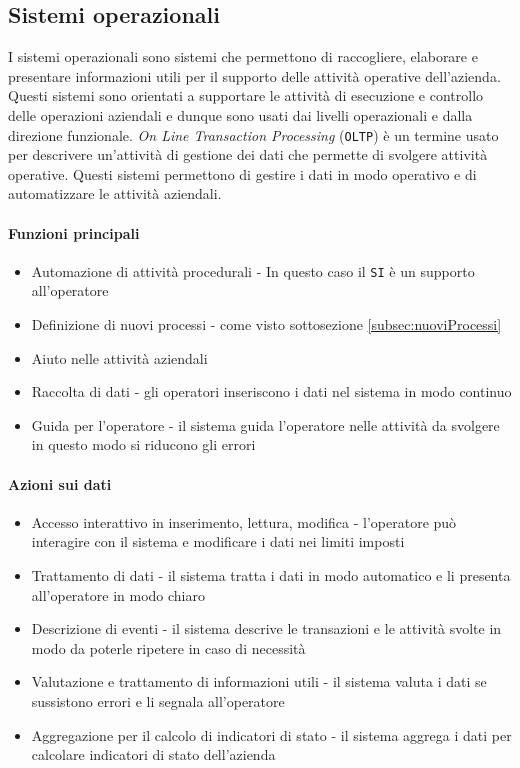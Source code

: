     \subsection{Sistemi operazionali}
        I sistemi operazionali sono sistemi che permettono di raccogliere, elaborare e presentare informazioni utili per il supporto delle attività operative dell'azienda. Questi sistemi sono orientati a supportare le attività di esecuzione e controllo delle operazioni aziendali e dunque sono usati dai livelli operazionali e dalla direzione funzionale.
        \textit{On Line Transaction Processing} (\texttt{OLTP}) è un termine usato per descrivere un'attività di gestione dei dati che permette di svolgere attività operative. Questi sistemi permettono di gestire i dati in modo operativo e di automatizzare le attività aziendali.
        \paragraph{Funzioni principali}
            \begin{itemize}
                \item Automazione di attività procedurali - In questo caso il \texttt{SI} è un supporto all'operatore
                \item Definizione di nuovi processi - come visto sottosezione \ref{subsec:nuoviProcessi}
                \item Aiuto nelle attività aziendali 
                \item Raccolta di dati - gli operatori inseriscono i dati nel sistema in modo continuo
                \item Guida per l'operatore - il sistema guida l'operatore nelle attività da svolgere in questo modo si riducono gli errori
            \end{itemize}
        \paragraph{Azioni sui dati}
            \begin{itemize}
                \item Accesso interattivo in inserimento, lettura, modifica - l'operatore può interagire con il sistema e modificare i dati nei limiti imposti 
                \item Trattamento di dati - il sistema tratta i dati in modo automatico e li presenta all'operatore in modo chiaro 
                \item Descrizione di eventi - il sistema descrive le transazioni e le attività svolte in modo da poterle ripetere in caso di necessità
                \item Valutazione e trattamento di informazioni utili - il sistema valuta i dati se sussistono errori e li segnala all'operatore
                \item Aggregazione per il calcolo di indicatori di stato - il sistema aggrega i dati per calcolare indicatori di stato dell'azienda
            \end{itemize}
